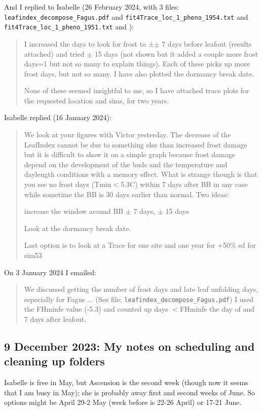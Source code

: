 \documentclass[11pt,letter]{article}
\begin{document}
And I replied to Isabelle (26 February 2024, with 3 files: \verb|leafindex_decompose_Fagus.pdf| and \verb|fit4Trace_loc_1_pheno_1954.txt| and \verb|fit4Trace_loc_1_pheno_1951.txt| and ):
\begin{quote}
I increased the days to look for frost to ±$\pm$ 7 days before leafout 
(results attached) and tried $\pm$ 15 days (not shown but it added a couple 
more frost days=1 but not so many to explain things). Each of these 
picks up more frost days, but not so many. I have also plotted the 
dormancy break date.

None of these seemed insightful to me, so I have attached trace plots 
for the requested location and sims, for two years.
\end{quote}


Isabelle replied (16 January 2024):
\begin{quote}
We look at your figures with Victor yesterday. The decrease of the 
LeafIndex cannot be due to something else than increased frost damage 
but it is difficult to show it on a simple graph because frost damage 
depend on the development of the buds and the temperature and 
daylength conditions with a memory effect. What is strange though is 
that you see no frost days (Tmin$<$5.3C) within 7 days after BB in any 
case while sometime the BB is 30 days earlier than normal. Two ideas:

increase the window around BB $\pm$ 7 days, $\pm$ 15 days

Look at the dormancy break date.

Last option is to look at a Trace for one site and one year for $+$50\%  sd for sim53
\end{quote}

On 3 January 2024 I emailed: 
\begin{quote}
We discussed getting the number of frost days and late leaf unfolding days, especially for Fagus ... (See file: \verb|leafindex_decompose_Fagus.pdf|) I used the FHminfe value (-5.3) and counted up days $<$FHminfe the day of and 7 days
after leafout. 
\end{quote}


\subsection{9 December 2023:  My notes on scheduling and cleaning up folders}
Isabelle is free in May, but Ascension is the second week (though now it seems that I am busy in May); she is probably away first and second weeks of June. So options might be April 29-2 May (week before is 22-26 April) or 17-21 June.
\end{document}
